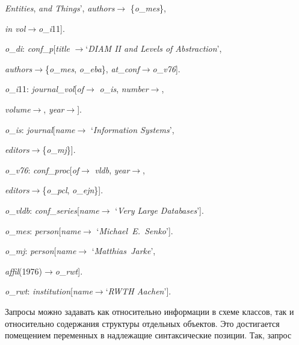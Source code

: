 \begin{multicols}{2}
\textit{Entities}, \textit{and Things}', \textit{authors}\;$\rightarrow$\;
\{\textit{o}\_\textit{mes}\},

 \textit{in vol}\;$\rightarrow$\;\textit{o}\_\textit{i}11].

\noindent
\textit{o}\_\textit{di}: \textit{conf}\_\textit{p}[\textit{title}\;
$\rightarrow$\;`\textit{DIAM II and Levels of Abstraction}',

\textit{authors}\;$\rightarrow$\;\{\textit{o}\_\textit{mes}, 
\textit{o}\_\textit{eba}\}, \textit{at}\_\textit{conf}\;$\rightarrow$\;\textit{o}\_\textit{v76}].

\noindent
\textit{o}\_\textit{i}11: \textit{journal}\_\textit{vol}[\textit{of}\;$\rightarrow$\;
\textit{o}\_\textit{is}, \textit{number}\;$\rightarrow$,

\textit{volume}\;$\rightarrow$, \textit{year}\;$\rightarrow$].

\noindent
\textit{o}\_\textit{is}: \textit{journal}[\textit{name}\;$\rightarrow$\;
`\textit{Information Systems}',

\textit{editors}\;$\rightarrow$\;\{\textit{o}\_\textit{mj}\}].

\noindent
\textit{o}\_\textit{v76}: \textit{conf}\_\textit{proc}[\textit{of}\;$\rightarrow$\;
\textit{vldb}, \textit{year}\;$\rightarrow$, 

\textit{editors}\;$\rightarrow$\;\{\textit{o}\_\textit{pcl},  \textit{o}\_\textit{ejn}\}].

\noindent
\textit{o}\_\textit{vldb}: \textit{conf}\_\textit{series}[\textit{name}\;$\rightarrow$\;
`\textit{Very Large Databases}'].

\noindent
\textit{o}\_\textit{mes}: \textit{person}[\textit{name}\;$\rightarrow$\;
`\textit{Michael\ E.\ Senko}'].

\noindent
\textit{o}\_\textit{mj}: \textit{person}[\textit{name}\;$\rightarrow$\;
`\textit{Matthias\ Jarke}', 

\textit{affil}(1976)\;$\rightarrow$\;\textit{o}\_\textit{rwt}].

\noindent
\textit{o}\_\textit{rwt}: \textit{institution}[\textit{name}\;$\rightarrow$\;`\textit{RWTH Aachen}'].



\smallskip

Запросы можно задавать как относительно информации в схеме классов, так и относительно 
содержания структуры отдельных объектов. Это достигается помещением переменных в 
надлежащие синтаксические позиции. Так, запрос


\end{multicols}
